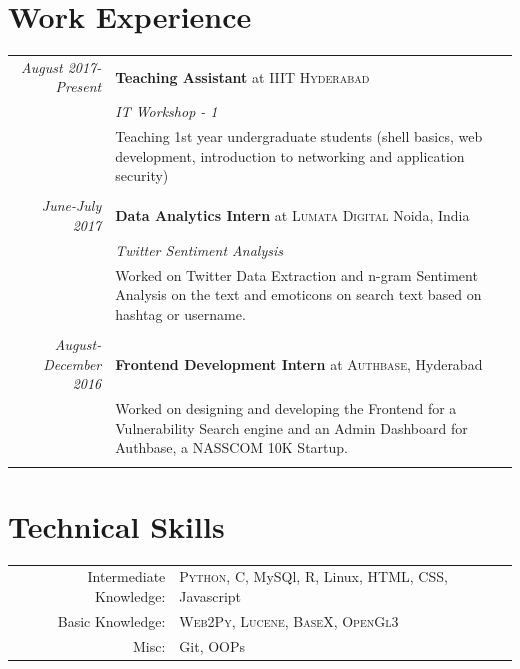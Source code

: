 \documentclass[a4paper,10pt]{article}
\begin{document}
\section{Work Experience}
\begin{tabular}{r|p{11cm}}


 \emph{August 2017-Present} & \textbf{Teaching Assistant} at \textsc{IIIT Hyderabad} \\\textsc{}&\emph{IT Workshop - 1}\\&\footnotesize{Teaching 1st year undergraduate students (shell basics, web
development, introduction to networking and application security)}\\\multicolumn{2}{c}{} \\
 

 \emph{June-July 2017} &\textbf{ Data Analytics Intern} at \textsc{Lumata Digital} Noida, India \\\textsc{}&\emph{Twitter Sentiment Analysis}\\&\footnotesize{Worked on Twitter Data Extraction and n-gram Sentiment Analysis on the text and emoticons on search text based on hashtag or username.}\\\multicolumn{2}{c}{} \\
 
 \emph{August-December 2016} &  \textbf{Frontend Development Intern} at \textsc{Authbase}, Hyderabad \\&\footnotesize{ Worked on designing and developing the Frontend for a Vulnerability Search engine and an Admin Dashboard for Authbase, a NASSCOM 10K Startup.}\\\multicolumn{2}{c}{} \\
\end{tabular}






\section{Technical Skills}
\begin{tabular}{rl}
Intermediate Knowledge:& \textsc{Python}, C, MySQl, R, Linux, HTML, CSS, Javascript\\
Basic Knowledge:& \textsc{Web2Py}, \textsc{Lucene}, \textsc{BaseX},  \textsc{OpenGl3}\\
Misc: &Git, OOPs 
 \setmainfont[SmallCapsFont=Fontin-SmallCaps.otf]{Fontin.otf}\\

\end{tabular}
\end{document}
